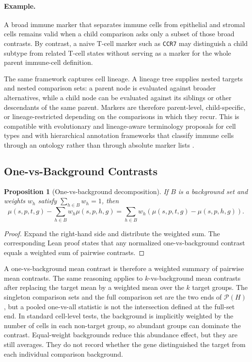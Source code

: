 \documentclass{article}
\newtheorem{proposition}{Proposition}
\begin{document}
\paragraph{Example.}
A broad immune marker that separates immune cells from epithelial and stromal cells remains valid when a child comparison asks only a subset of those broad contrasts. By contrast, a naive T-cell marker such as \texttt{CCR7} may distinguish a child subtype from related T-cell states without serving as a marker for the whole parent immune-cell definition.

The same framework captures cell lineage. A lineage tree supplies nested targets and nested comparison sets: a parent node is evaluated against broader alternatives, while a child node can be evaluated against its siblings or other descendants of the same parent. Markers are therefore parent-level, child-specific, or lineage-restricted depending on the comparisons in which they recur. This is compatible with evolutionary and lineage-aware terminology proposals for cell types \citep{Zhu2026RationalTerminology} and with hierarchical annotation frameworks that classify immune cells through an ontology rather than through absolute marker lists \citep{Beltz2026ImmuneHierarchy}.

\subsection{One-vs-Background Contrasts}

\begin{proposition}[One-vs-background decomposition]\label{prop:one-vs-background-decomposition}
If $B$ is a background set and weights $w_h$ satisfy $\sum_{h\in B}w_h=1$, then
\[
  \mu(s,p,t,g)-\sum_{h\in B}w_h\mu(s,p,h,g)
  =
  \sum_{h\in B}w_h\left(\mu(s,p,t,g)-\mu(s,p,h,g)\right).
\]
\end{proposition}

\begin{proof}
Expand the right-hand side and distribute the weighted sum. The corresponding Lean proof states that any normalized one-vs-background contrast equals a weighted sum of pairwise contrasts.
\end{proof}

A one-vs-background mean contrast is therefore a weighted summary of pairwise mean contrasts. The same reasoning applies to $k$-vs-background mean contrasts after replacing the target mean by a weighted mean over the $k$ target groups. The singleton comparison sets and the full comparison set are the two ends of $\mathcal{P}(H)$, but a pooled one-vs-all statistic is not the intersection defined at the full-set end. In standard cell-level tests, the background is implicitly weighted by the number of cells in each non-target group, so abundant groups can dominate the contrast. Equal-weight backgrounds reduce this abundance effect, but they are still averages. They do not record whether the gene distinguished the target from each individual comparison background.
\end{document}
